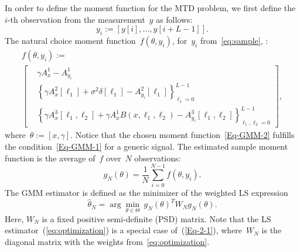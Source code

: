 \documentclass{article}
\newcommand{\rev}[1]{{\color{magenta}{#1}}}
\begin{document}
In order to define the moment function for the MTD problem, we first define the $i$-th observation from the measurement~$y$ as follows:
\begin{equation}\label{eq:sample}
	y_i := [y[i],\ldots, y[i+L-1]].
\end{equation}
The natural choice \rev{of a} moment function~$f(\theta, y_i)$, for~$y_i$ from~\eqref{eq:sample}, \rev{is the discrepancy between the autocorrelations of~$y_i$ and the population autocorrelations}:
\begin{multline} \label{Eq-GMM-2}
	f(\theta, y_i) := \\
	\begin{bmatrix}
		&\gamma A_x^1 - A_{y_i}^1\\
		&\left\{\gamma A_x^2[\ell_1] + \sigma^2 \delta[\ell_1] - A_{y_i}^2 [\ell_1]\right\}_{\ell_1 = 0}^{L-1} \\
		&\left\{\gamma A_x^3[\ell_1, \ell_2] + \gamma A_{x}^1 B(x, \ell_1, \ell_2) - A_{y_i}^3[\ell_1, \ell_2]\right\}_{\ell_1, \ell_2 = 0}^{L-1}
	\end{bmatrix},
\end{multline}
where~\mbox{$\theta := [x, \gamma]$}. Notice that the chosen moment function~\eqref{Eq-GMM-2} fulfills the \rev{uniqueness} condition~\eqref{Eq-GMM-1} for a generic signal. The estimated sample moment function is the average of~$f$ over~$N$ observations:
\begin{equation}\label{Eq-2-5}
	g_N(\theta) = \frac{1}{N} \sum_{i = 0}^{N - 1} f(\theta, y_i).
\end{equation}
The GMM estimator is defined as the minimizer of the weighted LS expression
\begin{equation} \label{eq:opt_theta}
	\hat{\theta}_N = \arg\min_{\theta \in \Theta} \ g_N(\theta)^T W_N g_N(\theta).
\end{equation}
Here, $W_N$ is a fixed positive semi-definite (PSD) matrix. Note that the LS estimator~(\ref{eq:optimization}) is a special case of~(\ref{Eq-2-1}), where~$W_N$ is the diagonal matrix with the weights from~\eqref{eq:optimization}.
\end{document}
